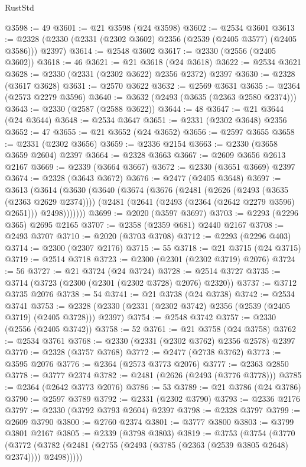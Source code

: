 \begin{lexlean}{RustStd}
\begin{coremodule}
@3598 := 49
@3601 := @21 @3598 (@24 @3598)
@3602 := @2534 @3601
@3613 := @2328 (@2330 (@2331 (@2302 @3602) @2356 (@2539 (@2405 @3577) (@2405 @3586))) @2397)
@3614 := @2548 @3602
@3617 := @2330 (@2556 (@2405 @3602))
@3618 := 46
@3621 := @21 @3618 (@24 @3618)
@3622 := @2534 @3621
@3628 := @2330 (@2331 (@2302 @3622) @2356 @2372) @2397
@3630 := @2328 (@3617 @3628)
@3631 := @2570 @3622
@3632 := @2569 @3631
@3635 := @2364 (@2573 @2279 @3596)
@3640 := @3632 (@2493 (@3635 (@2363 @2580 @2374)))
@3643 := @2330 (@2587 (@2588 @3622))
@3644 := 48
@3647 := @21 @3644 (@24 @3644)
@3648 := @2534 @3647
@3651 := @2331 (@2302 @3648) @2356
@3652 := 47
@3655 := @21 @3652 (@24 @3652)
@3656 := @2597 @3655
@3658 := @2331 (@2302 @3656)
@3659 := @2336 @2154
@3663 := @2330 (@3658 @3659 @2604) @2397
@3664 := @2328 @3663
@3667 := @2609 @3656 @2613 @2167
@3669 := @2339 (@3664 @3667)
@3672 := @2330 (@3651 @3669) @2397
@3674 := @2328 (@3643 @3672)
@3676 := @2477 (@2405 @3648)
@3697 := @3613
    (@3614
      (@3630
        (@3640
          (@3674
            (@3676
              (@2481
                (@2626 (@2493 (@3635 (@2363 @2629 @2374))))
                (@2481 (@2641 (@2493 (@2364 (@2642 @2279 @3596) @2651))) @2498)))))))
@3699 := @2020 (@3597 @3697)
@3703 := @2293 (@2296 @365) @2695 @2165
@3707 := @2358 (@2359 @681) @2440 @2167
@3708 := @2493 @3707
@3710 := @2020 (@3703 @3708)
@3712 := @2293 (@2296 @403)
@3714 := @2300 (@2307 @2176)
@3715 := 55
@3718 := @21 @3715 (@24 @3715)
@3719 := @2514 @3718
@3723 := @2300 (@2301 (@2302 @3719) @2076)
@3724 := 56
@3727 := @21 @3724 (@24 @3724)
@3728 := @2514 @3727
@3735 := @3714 (@3723 (@2300 (@2301 (@2302 @3728) @2076) @2320))
@3737 := @3712 @3735 @2076
@3738 := 54
@3741 := @21 @3738 (@24 @3738)
@3742 := @2534 @3741
@3753 := @2328 (@2330 (@2331 (@2302 @3742) @2356 (@2539 (@2405 @3719) (@2405 @3728))) @2397)
@3754 := @2548 @3742
@3757 := @2330 (@2556 (@2405 @3742))
@3758 := 52
@3761 := @21 @3758 (@24 @3758)
@3762 := @2534 @3761
@3768 := @2330 (@2331 (@2302 @3762) @2356 @2578) @2397
@3770 := @2328 (@3757 @3768)
@3772 := @2477 (@2738 @3762)
@3773 := @3595 @2076
@3776 := @2364 (@2573 @3773 @2076)
@3777 := @2363 @2850
@3778 := @3777 @2374
@3782 := @2481 (@2626 (@2493 (@3776 @3778)))
@3785 := @2364 (@2642 @3773 @2076)
@3786 := 53
@3789 := @21 @3786 (@24 @3786)
@3790 := @2597 @3789
@3792 := @2331 (@2302 @3790)
@3793 := @2336 @2176
@3797 := @2330 (@3792 @3793 @2604) @2397
@3798 := @2328 @3797
@3799 := @2609 @3790
@3800 := @2760 @2374
@3801 := @3777 @3800
@3803 := @3799 @3801 @2167
@3805 := @2339 (@3798 @3803)
@3819 := @3753
    (@3754
      (@3770
        (@3772 (@3782 (@2481 (@2755 (@2493 (@3785 (@2363 (@2539 @3805 @2648) @2374)))) @2498)))))

\end{coremodule}
\end{lexlean}
